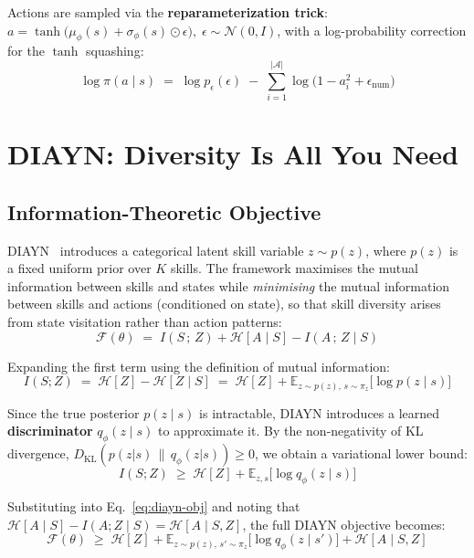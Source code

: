 \documentclass[11pt,a4paper]{article}
\begin{document}
Actions are sampled via the \textbf{reparameterization trick}: $a = \tanh\!\big(\mu_\phi(s) + \sigma_\phi(s)\odot\epsilon\big),\;\epsilon\sim\mathcal{N}(0,I)$, with a log-probability correction for the $\tanh$ squashing:
\begin{equation}
    \log\pi(a\mid s) \;=\; \log p_\epsilon(\epsilon) \;-\; \sum_{i=1}^{|\mathcal{A}|}\log\!\big(1 - a_i^2 + \epsilon_{\text{num}}\big)
\end{equation}

\section{DIAYN: Diversity Is All You Need}

\subsection{Information-Theoretic Objective}

DIAYN~\cite{eysenbach2019diayn} introduces a categorical latent skill variable $z \sim p(z)$, where $p(z)$ is a fixed uniform prior over $K$ skills. The framework maximises the mutual information between skills and states while \emph{minimising} the mutual information between skills and actions (conditioned on state), so that skill diversity arises from state visitation rather than action patterns:
\begin{equation}\label{eq:diayn-obj}
    \mathcal{F}(\theta) \;=\; I(S\,;\,Z) + \mathcal{H}[A \mid S] - I(A\,;\,Z \mid S)
\end{equation}

Expanding the first term using the definition of mutual information:
\begin{equation}
    I(S;Z) \;=\; \mathcal{H}[Z] - \mathcal{H}[Z\mid S] \;=\; \mathcal{H}[Z] + \mathbb{E}_{z\sim p(z),\,s\sim\pi_z}\!\big[\log p(z\mid s)\big]
\end{equation}

Since the true posterior $p(z\mid s)$ is intractable, DIAYN introduces a learned \textbf{discriminator} $q_\phi(z\mid s)$ to approximate it. By the non-negativity of KL divergence, $D_{\mathrm{KL}}(p(z|s)\,\|\,q_\phi(z|s)) \geq 0$, we obtain a variational lower bound:
\begin{equation}\label{eq:mi-bound}
    I(S;Z) \;\geq\; \mathcal{H}[Z] + \mathbb{E}_{z,s}\!\big[\log q_\phi(z\mid s)\big]
\end{equation}

Substituting into Eq.~\eqref{eq:diayn-obj} and noting that $\mathcal{H}[A \mid S] - I(A;Z\mid S) = \mathcal{H}[A\mid S,Z]$, the full DIAYN objective becomes:
\begin{equation}\label{eq:diayn-full}
    \boxed{\;\mathcal{F}(\theta) \;\geq\; \mathcal{H}[Z] + \mathbb{E}_{z\sim p(z),\,s'\sim\pi_z}\!\big[\log q_\phi(z\mid s')\big] + \mathcal{H}[A\mid S,Z]\;}
\end{equation}
\end{document}
